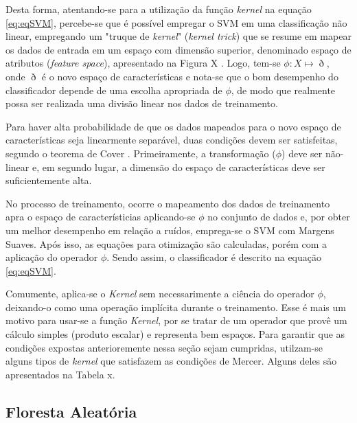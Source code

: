 Desta forma, atentando-se para a utilização da função \textit{kernel} na equação \ref{eq:eqSVM}, percebe-se que é possível empregar o SVM em uma classificação não linear, empregando um "truque de \textit{kernel}" { }(\textit{kernel trick}) que se resume em mapear os dados de entrada em um espaço com dimensão superior, denominado espaço de atributos (\textit{feature space}), apresentado na Figura X  . Logo, tem-se $\phi:X\mapsto\eth$, onde $\eth$ é o novo espaço de características e nota-se que o bom desempenho do classificador depende de uma escolha apropriada de $\phi$, de modo que realmente possa ser realizada uma divisão linear nos dados de treinamento.

Para haver alta probabilidade de que os dados mapeados para o novo espaço de características seja linearmente separável, duas condições devem ser satisfeitas, segundo o teorema de Cover . Primeiramente, a transformação ($\phi$) deve ser não-linear e, em segundo lugar, a dimensão do espaço de características deve ser suficientemente alta.

No processo de treinamento, ocorre o mapeamento dos dados de treinamento apra o espaço de característicias aplicando-se $\phi$ no conjunto de dados e, por obter um melhor desempenho em relação a ruídos, emprega-se o SVM com Margens Suaves. Após isso, as equações para otimização são calculadas, porém com a aplicação do operador $\phi$. Sendo assim, o classificador é descrito na equação \ref{eq:eqSVM}.

Comumente, aplica-se o \textit{Kernel} sem necessarimente a ciência do operador $\phi$, deixando-o como uma operação implícita durante o treinamento. Esse é mais um motivo para usar-se a função \textit{Kernel}, por se tratar de um operador que provê um cálculo simples (produto escalar) e representa bem espaços. Para garantir que as condições expostas anterioremente nessa seção sejam cumpridas, utilzam-se alguns tipos de \textit{kernel} que satisfazem as condições de Mercer. Alguns deles são apresentados na Tabela x.



\subsection{Floresta Aleatória}
